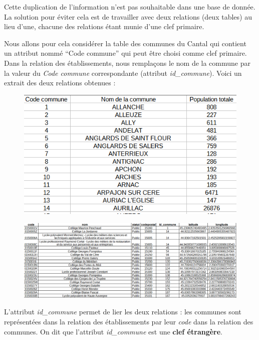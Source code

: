 \documentclass[
  letterpaper,
  DIV=11,
  numbers=noendperiod]{scrartcl}
\begin{document}
Cette duplication de l'information n'est pas souhaitable dans une base
de donnée. La solution pour éviter cela est de travailler avec deux
relations (deux tables) au lieu d'une, chacune des relations étant munie
d'une clef primaire.

Nous allons pour cela considérer la table des communes du Cantal qui
contient un attribut nommé ``Code commune'' qui peut être choisi comme
clef primaire. Dans la relation des établissements, nous remplaçons le
nom de la commune par la valeur du \emph{Code commune} correspondante
(attribut \emph{id\_commune}). Voici un extrait des deux relations
obtenues :

\begin{figure}

{\centering \includegraphics{BDD7.png}

}

\end{figure}

\begin{figure}

{\centering \includegraphics{BDD8.png}

}

\end{figure}

L'attribut \emph{id\_commune} permet de lier les deux relations : les
communes sont représentées dans la relation des établissements par leur
\emph{code} dans la relation des communes. On dit que l'attribut
\emph{id\_commune} est une \textbf{clef étrangère}.
\end{document}

